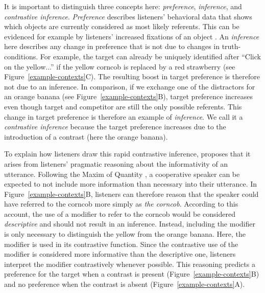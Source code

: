 \documentclass[a4paper,man,floatsintext,natbib]{apa6}
\newcommand{\figref}[1]{Figure~\ref{#1}}
\begin{document}
It is important to distinguish three concepts here: \textit{preference}, \textit{inference}, and \textit{contrastive inference}. \emph{Preference} describes listeners' behavioral data that shows which objects are currently considered as most likely referents. This can be evidenced for example by listeners' increased fixations of an object \citep{Tanenhaus:1995,Eberhard:1995}. An \emph{inference} here describes any change in preference that is not due to changes in truth-conditions. For example, the target can already be uniquely identified after ``Click on the yellow...'' if the yellow corncob is replaced by a red strawberry (see \figref{example-contexts}C). The resulting boost in target preference is therefore not due to an inference. In comparison, if we exchange one of the distractors for an orange banana (see \figref{example-contexts}B), target preference increases even though target and competitor are still the only possible referents. This change in target preference is therefore an example of \emph{inference}. We call it a \emph{contrastive inference} because the target preference increases due to the introduction of a contrast (here the orange banana).

To explain how listeners draw this rapid contrastive inference, \cite{Sedivy:2003} proposes that it arises from listeners' pragmatic reasoning about the informativity of an utterance. Following the Maxim of Quantity \citep{Grice:1975}, a cooperative speaker can be expected to not include more information than necessary into their utterance. In \figref{example-contexts}B, listeners can therefore reason that the speaker could have referred to the corncob more simply as \textit{the corncob}. According to this account, the use of a modifier to refer to the corncob would be considered \emph{descriptive} and should not result in an inference. Instead, including the modifier is only necessary to distinguish the yellow from the orange banana. Here, the modifier is used in its contrastive function. Since the contrastive use of the modifier is considered more informative than the descriptive one, listeners interpret the modifier contrastively whenever possible. This reasoning predicts a preference for the target when a contrast is present (\figref{example-contexts}B) and no preference when the contrast is absent (\figref{example-contexts}A).
\end{document}
